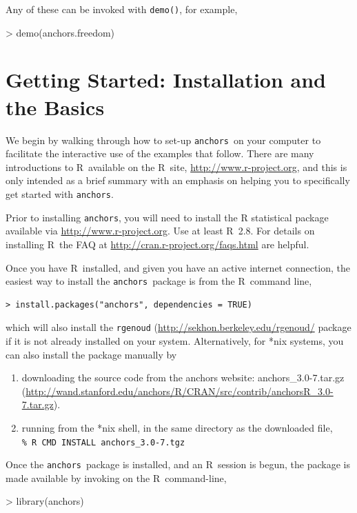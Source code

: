 \documentclass{amsart}
\newcommand{\code}[1]{{\texttt{#1}}}
\newcommand{\Rpackage}[1]{{\texttt{#1}}}
\newcommand{\R}{{\normalfont\textsf{R}}{}}
\newcommand{\AnchorsVer}{3.0-7}
\newcommand{\RVer}{2.8}
\newcommand{\Ranchors}{{\texttt{anchors}}}
\begin{document}
Any of these can be invoked with \code{demo()}, for example,
\begin{Schunk}
\begin{Sinput}
> demo(anchors.freedom)
\end{Sinput}
\end{Schunk}


\section{Getting Started: Installation and the Basics}

We begin by walking through how to set-up \Ranchors\ on your computer
to facilitate the interactive use of the examples that follow.  
There are many introductions to \R\ available on the \R\ site,
\url{http://www.r-project.org},
and this is only intended as a brief summary with an emphasis on
helping you to specifically get started with \Ranchors.

Prior to installing \Ranchors, you will need to install the \R
statistical package available via 
\url{http://www.r-project.org}.  Use at least \R\ \RVer.
For details on installing \R\ the FAQ at
\url{http://cran.r-project.org/faqs.html}
are helpful.

Once you have \R\ installed, and given you have an active internet
connection, the easiest way to install the \Ranchors\ package is from
the \R\ command line,
\begin{verbatim}
> install.packages("anchors", dependencies = TRUE)
\end{verbatim}
which will also install the 
\Rpackage{rgenoud} (\url{http://sekhon.berkeley.edu/rgenoud/}
 package if it is not already installed on your system.
 Alternatively, for *nix systems, you can also install the package
manually by 
\begin{enumerate}
  \item downloading the source code from the anchors website:
    anchors\_\AnchorsVer.tar.gz (\url{http://wand.stanford.edu/anchors/R/CRAN/src/contrib/anchorsR_\AnchorsVer.tar.gz}).
  \item
    running from the *nix shell, in the same directory as the downloaded file, \\
    \texttt{\% R CMD INSTALL anchors\_\AnchorsVer.tgz}
\end{enumerate}

Once the \Ranchors\ package is installed, and an \R\ session is begun, 
the package is made available by invoking on the \R\ command-line,
\begin{Schunk}
\begin{Sinput}
> library(anchors)
\end{Sinput}
\end{Schunk}
\end{document}
